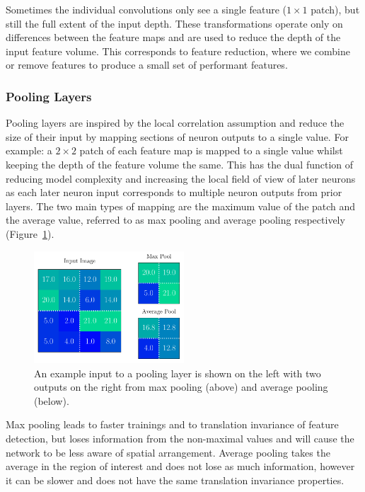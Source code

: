 Sometimes the individual convolutions only see a single feature ($1\times{}1$ patch), but still the full extent of the input depth. These transformations operate only on differences between the feature maps and are used to reduce the depth of the input feature volume. 
This corresponds to feature reduction, where we combine or remove features to produce a small set of performant features. 



\subsubsection{Pooling Layers}
Pooling layers are inspired by the local correlation assumption and reduce the size of their input by mapping sections of neuron outputs to a single value. For example: a $2\times{}2$ patch of each feature map is mapped to a single value whilst keeping the depth of the feature volume the same.
This has the dual function of reducing model complexity and increasing the local field of view of later neurons as each later neuron input corresponds to multiple neuron outputs from prior layers. 
The two main types of mapping are the maximum value of the patch and the average value, referred to as max pooling and average pooling respectively (Figure~\ref{fig:machine_learning:pooling}). 
\begin{figure}[h!]
    \centering
    \includegraphics[width=0.5\textwidth]{figures/machine_learning/pooling.pdf}
    \caption{An example input to a pooling layer is shown on the left with two outputs on the right from max pooling (above) and average pooling (below).}
        \label{fig:machine_learning:pooling}
\end{figure}

Max pooling leads to faster trainings and to translation invariance of feature detection, but loses information from the non-maximal values and will cause the network to be less aware of spatial arrangement.  
Average pooling takes the average in the region of interest and does not lose as much information, however it can be slower and does not have the same translation invariance properties. 


